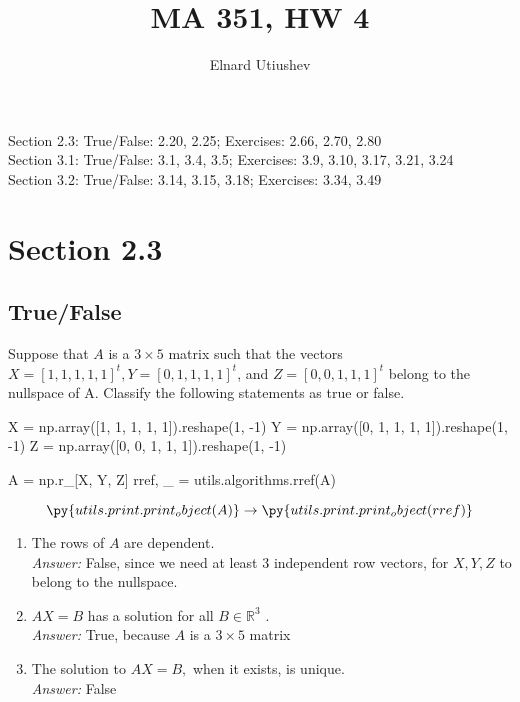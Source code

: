 \documentclass[letterpaper]{article}
\title{MA 351, HW 4}
\author{Elnard Utiushev}
\newcommand{\ans}{\textit{Answer: }}
\newenvironment{question}[2][Question]{\begin{trivlist}
\item[\hskip \labelsep {\bfseries #1}\hskip \labelsep {\bfseries #2.}]}{\end{trivlist}}
\newcommand{\printobj}[1]{\py{utils.print.print_object(#1)}}
\begin{document}
\maketitle

Section 2.3: True/False: 2.20, 2.25; Exercises: 2.66, 2.70, 2.80 \\ 
Section 3.1: True/False: 3.1, 3.4, 3.5; Exercises: 3.9, 3.10, 3.17, 3.21, 3.24 \\
Section 3.2: True/False: 3.14, 3.15, 3.18; Exercises: 3.34, 3.49

\section{Section 2.3}
\subsection{True/False}

\begin{question}{2.20}
    Suppose that $A$ is a $3 \times 5$ matrix such that the vectors 
    $ X = [ 1,1,1,1,1 ] ^ { t } , Y = [ 0,1,1,1,1 ] ^ { t }$,
    and $Z = [ 0,0,1,1,1 ] ^ { t }$ belong to the nullspace of A. 
    Classify the following statements as true or false.

\begin{pycode}
X = np.array([1, 1, 1, 1, 1]).reshape(1, -1)
Y = np.array([0, 1, 1, 1, 1]).reshape(1, -1)
Z = np.array([0, 0, 1, 1, 1]).reshape(1, -1)

A = np.r_[X, Y, Z]
rref, _ = utils.algorithms.rref(A)
\end{pycode}

$$\printobj{A} \rightarrow \printobj{rref}$$

    \begin{enumerate}[label=(\alph*)]
        \item The rows of $A$ are dependent. \\
        \ans False, since we need at least 3 independent row vectors, for 
        $X, Y, Z$ to belong to the nullspace.

        \item $A X = B$ has a solution for all $B \in \mathbb { R } ^ { 3 }$ . \\
        \ans True, because $A$ is a $3 \times 5$ matrix

        \item The solution to $A X = B ,$ when it exists, is unique. \\
        \ans False
    \end{enumerate}

\end{question}
\end{document}
